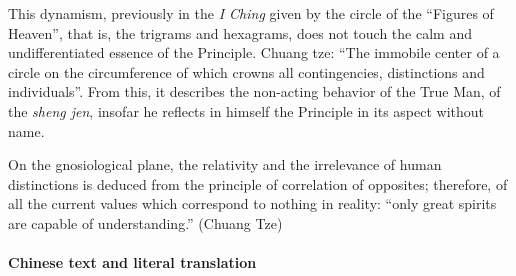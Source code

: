 This dynamism, previously in the \emph{I Ching} given by the circle of the ``Figures of Heaven'', that is, the trigrams and hexagrams, does not touch the calm and undifferentiated essence of the Principle. Chuang tze: ``The immobile center of a circle on the circumference of which crowns all contingencies, distinctions and individuals''. From this, it describes the non-acting behavior of the True Man, of the \emph{sheng jen}, insofar he reflects in himself the Principle in its aspect without name.

On the gnosiological plane, the relativity and the irrelevance of human distinctions is deduced from the principle of correlation of opposites; therefore, of all the current values which correspond to nothing in reality: ``only great spirits are capable of understanding.'' (Chuang Tze)

\paragraph{Chinese text and literal translation}


